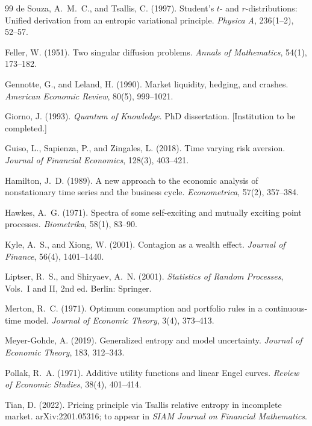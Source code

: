 \documentclass[11pt,a4paper]{article}
\theoremstyle{remark}
\begin{document}
\begin{thebibliography}{99}
de Souza, A.~M.~C., and Tsallis, C. (1997). Student's $t$- and $r$-distributions: Unified
derivation from an entropic variational principle. \emph{Physica A}, 236(1--2), 52--57.

Feller, W. (1951). Two singular diffusion problems. \emph{Annals of Mathematics}, 54(1),
173--182.

Gennotte, G., and Leland, H. (1990). Market liquidity, hedging, and crashes.
\emph{American Economic Review}, 80(5), 999--1021.

Giorno, J. (1993). \emph{Quantum of Knowledge}. PhD dissertation. [Institution to be
completed.]

Guiso, L., Sapienza, P., and Zingales, L. (2018). Time varying risk aversion. \emph{Journal
of Financial Economics}, 128(3), 403--421.

Hamilton, J.~D. (1989). A new approach to the economic analysis of nonstationary time
series and the business cycle. \emph{Econometrica}, 57(2), 357--384.

Hawkes, A.~G. (1971). Spectra of some self-exciting and mutually exciting point processes.
\emph{Biometrika}, 58(1), 83--90.

Kyle, A.~S., and Xiong, W. (2001). Contagion as a wealth effect. \emph{Journal of Finance},
56(4), 1401--1440.

Liptser, R.~S., and Shiryaev, A.~N. (2001). \emph{Statistics of Random Processes}, Vols.~I
and II, 2nd ed. Berlin: Springer.

Merton, R.~C. (1971). Optimum consumption and portfolio rules in a continuous-time model.
\emph{Journal of Economic Theory}, 3(4), 373--413.

Meyer-Gohde, A. (2019). Generalized entropy and model uncertainty. \emph{Journal of Economic
Theory}, 183, 312--343.

Pollak, R.~A. (1971). Additive utility functions and linear Engel curves. \emph{Review of
Economic Studies}, 38(4), 401--414.

Tian, D. (2022). Pricing principle via Tsallis relative entropy in incomplete market.
arXiv:2201.05316; to appear in \emph{SIAM Journal on Financial Mathematics}.


\end{thebibliography}
\end{document}
